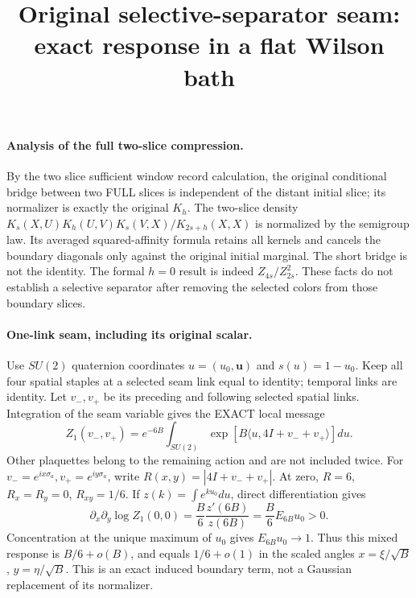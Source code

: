\documentclass[11pt]{article}
\title{Original selective-separator seam: exact response in a flat Wilson bath}\author{}\date{}
\begin{document}
\maketitle
\paragraph{Analysis of the full two-slice compression.}
By the two slice sufficient window record calculation, the original conditional bridge between two FULL slices is
independent of the distant initial slice; its normalizer is exactly the
original $K_h$. The two-slice density
$K_s(X,U)K_h(U,V)K_s(V,X)/K_{2s+h}(X,X)$ is normalized by the semigroup law.
Its averaged squared-affinity formula retains all kernels and cancels the
boundary diagonals only against the original initial marginal. The short
bridge is not the identity. The formal $h=0$ result is indeed
$Z_{4s}/Z_{2s}^2$. These facts do not establish a selective separator after
removing the selected colors from those boundary slices.

\paragraph{One-link seam, including its original scalar.}
Use $SU(2)$ quaternion coordinates $u=(u_0,\mathbf u)$ and
$s(u)=1-u_0$. Keep all four spatial staples at a selected seam link equal to
identity; temporal links are identity. Let $v_-,v_+$ be its preceding and
following selected spatial links. Integration of the seam variable gives the
EXACT local message
\[
 Z_1(v_-,v_+)=e^{-6B}\int_{SU(2)}
       \exp[B\langle u,4I+v_-+v_+\rangle]du.                            \tag{1}
\]
Other plaquettes belong to the remaining action and are not included twice.
For $v_-=e^{ix\sigma_a},v_+=e^{iy\sigma_a}$, write
$R(x,y)=|4I+v_-+v_+|$. At zero,
$R=6$, $R_x=R_y=0$, $R_{xy}=1/6$. If
$z(k)=\int e^{ku_0}du$, direct differentiation gives
\[
 \partial_x\partial_y\log Z_1(0,0)
 =\frac B6\frac{z'(6B)}{z(6B)}
 =\frac B6 E_{6B}u_0>0.                                                 \tag{2}
\]
Concentration at the unique maximum of $u_0$ gives $E_{6B}u_0\to1$.
Thus this mixed response is $B/6+o(B)$, and equals $1/6+o(1)$ in the scaled
angles $x=\xi/\sqrt B$, $y=\eta/\sqrt B$. This is an exact induced boundary
term, not a Gaussian replacement of its normalizer.
\end{document}
